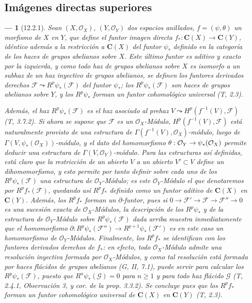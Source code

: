 \documentclass[10pt,oneside,openany]{book}
\theoremstyle{egaenv}\newtheorem*{env}{---}
\theoremstyle{egastatement}
\theoremstyle{egadescription}
\renewcommand{\geq}{\geqslant}
\renewcommand{\to}{\mathchoice{\longrightarrow}{\rightarrow}{\rightarrow}{\rightarrow}}
\begin{document}
\subsection{Imágenes directas superiores}
\label{subsection:0.12.2-fr}

\begin{env}[12.2.1]
\label{0.12.2.1-fr}
Sean $(X,\mathcal O_X)$, $(Y,\mathcal O_Y)$ dos espacios anillados,
$f=(\psi,\theta)$ un morfismo de $X$ en $Y$, que define el funtor
\emph{imagen directa}
$f_*:\boldsymbol{C}(X)\longrightarrow\boldsymbol{C}(Y)$,
idéntico además a la restricción a $\boldsymbol{C}(X)$ del funtor $\psi_*$ definido
en la categoría de los haces de grupos abelianos sobre $X$. Este último
funtor es aditivo y exacto por la izquierda, y como todo haz de grupos
abelianos sobre $X$ es isomorfo a un subhaz de un haz \emph{inyectivo} de
grupos abelianos, se definen los \emph{funtores derivados} derechos
$\mathcal F\leadsto R^p\psi_*(\mathcal F)$ del funtor $\psi_*$; los
$R^p\psi_*(\mathcal F)$ son haces de grupos abelianos sobre $Y$, y
los $R^p\psi_*$ forman un \emph{funtor cohomológico universal} (T, 2.3).

Además, el haz $R^p\psi_*(\mathcal F)$ es el haz asociado al
prehaz $V\leadsto H^p(f^{-1}(V),\mathcal F)$ (T, 3.7.2). Si ahora
se supone que $\mathcal F$ es un $\mathcal O_X$-\emph{Módulo},
$H^p(f^{-1}(V),\mathcal F)$ está naturalmente provisto de una estructura de
$\Gamma(f^{-1}(V),\mathcal O_X)$-módulo, luego de
$\Gamma(V,\psi_*(\mathcal O_X))$-módulo, y el dato del homomorfismo
$\theta:\mathcal O_Y\to\psi_*(\mathcal O_X)$ permite deducir una
estructura de $\Gamma(V,\mathcal O_Y)$-módulo. Para las estructuras así
definidas, está claro que la restricción de un abierto $V$ a un abierto
$V'\subset V$ define un dihomomorfismo, y esto permite por tanto definir sobre
cada uno de los $R^p\psi_*(\mathcal F)$ una estructura de $\mathcal O_Y$-\emph{Módulo};
es este $\mathcal O_Y$-Módulo el que denotaremos por $R^p f_*(\mathcal F)$,
quedando así $R^p f_*$ definido como un funtor aditivo de $\boldsymbol{C}(X)$ en
$\boldsymbol{C}(Y)$. Además, los $R^p f_*$ forman un \emph{$\partial$-funtor}, pues si
$0\longrightarrow\mathcal F'\longrightarrow\mathcal F
\longrightarrow\mathcal F''\longrightarrow0$
es una sucesión exacta de $\mathcal O_X$-Módulos, la descripción de los
$R^p\psi_*$ y de la estructura de $\mathcal O_Y$-Módulo sobre
$R^p\psi_*(\mathcal F)$ dada arriba muestra inmediatamente que
el homomorfismo
$\partial:R^p\psi_*(\mathcal F'')\longrightarrow
R^{p+1}\psi_*(\mathcal F')$
es en este caso un homomorfismo de $\mathcal O_Y$-\emph{Módulos}. Finalmente, los
$R^p f_*$ se identifican con los funtores \emph{derivados} derechos de $f_*$: en efecto,
todo $\mathcal O_X$-Módulo admite una resolución \emph{inyectiva} formada por
$\mathcal O_X$-Módulos, y como tal resolución está formada por haces
\emph{flácidos} de grupos abelianos (G, II, 7.1), puede servir para calcular los
$R^p\psi_*(\mathcal F)$, puesto que $R^n\psi_*(\mathcal G)=0$ para $n\geq1$ y
para todo haz \emph{flácido} $\mathcal G$ (T, 2.4.1, Observación 3, y cor. de la
prop. 3.3.2). Se concluye pues que los $R^p f_*$ forman un \emph{funtor
cohomológico universal de} $\boldsymbol{C}(X)$ en $\boldsymbol{C}(Y)$ (T, 2.3).
\end{env}
\end{document}
